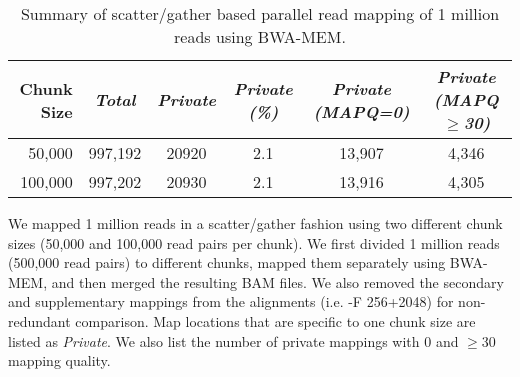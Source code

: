 \begin{table}[htb]
\caption{Summary of scatter/gather based parallel read mapping of 1 million reads using BWA-MEM.}
\begin{center}
\begin{tabular}{|r|c|c|c|c|c|}
\hline
{\bf Chunk Size } & {\it Total} & {\it Private} & {\it Private (\%)} & {\it Private (MAPQ=0)} & {\it Private (MAPQ$\geq$30)} \\
\hline
50,000 &  997,192 & 20920 & 2.1 & 13,907  & 4,346 \\ 
100,000 & 997,202 & 20930 & 2.1 & 13,916 & 4,305 \\
\hline
\end{tabular}
\end{center}
{\footnotesize We mapped 1 million reads in a scatter/gather fashion using two different chunk sizes (50,000 and 100,000 read pairs per chunk). We first divided 1 million reads (500,000 read pairs) to
different chunks, mapped them separately using BWA-MEM, and then merged the resulting BAM files. We also removed the secondary and supplementary mappings from the alignments (i.e. -F 256+2048) for non-redundant comparison.
Map locations that are specific to one chunk size are listed as {\it Private}. We also list the number of private mappings
with $0$ and $\geq 30$ mapping quality.}
\label{supptab:bwa-map-scatter}
\end{table}

